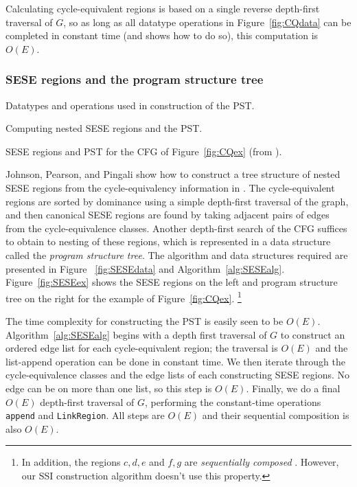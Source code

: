 \documentclass[12pt,titlepage,twoside]{article}
\newcommand{\figscale}{1.0}
\begin{document}
Calculating cycle-equivalent regions is based on a single reverse
depth-first traversal of $G$, so as long as all datatype operations in
Figure~\ref{fig:CQdata} can be completed in constant time (and
\cite{johnson93:sese} shows how to do so), this computation is $O(E)$.

\subsubsection{SESE regions and the program structure tree}
\begin{myfigure}\small
\caption{Datatypes and operations used in construction of the PST.}
\label{fig:SESEdata}\end{myfigure}
\begin{myalgorithm}\small
\caption{Computing nested SESE regions and the PST.}
\label{alg:SESEalg}\end{myalgorithm}
\begin{myfigure}\centering
\vertcenter{\renewcommand{\figscale}{0.5}}\hspace{1cm}
\vertcenter{\renewcommand{\figscale}{0.7}}
\caption{SESE regions and PST for the CFG of
         Figure~\ref{fig:CQex} (from \cite{johnson94:pst}).}
\label{fig:SESEex}\end{myfigure}

Johnson, Pearson, and Pingali show how to construct a tree structure
of nested SESE regions from the cycle-equivalency information in
\cite{johnson94:pst}.  The cycle-equivalent regions are sorted by
dominance using a simple depth-first traversal of the graph, and then
canonical SESE regions are found by taking adjacent pairs of
edges from the cycle-equivalence classes.  Another depth-first search
of the CFG suffices to obtain to nesting of these regions,
which is represented in a data structure called the 
\emph{program structure tree}.
The algorithm and data structures required are presented in Figure~%
\ref{fig:SESEdata} and Algorithm~\ref{alg:SESEalg}.  Figure~\vref{fig:SESEex}
shows the SESE regions on the left and program structure tree on
the right for the example of Figure~\vref{fig:CQex}.%
\footnote{In addition, the regions ${c,d,e}$ and ${f,g}$ are
\emph{sequentially composed} \cite{johnson94:pst}. 
However, our SSI construction algorithm doesn't use this property.}

The time complexity for constructing the PST is easily seen to be
$O(E)$. Algorithm~\vref{alg:SESEalg} begins
with a depth first traversal of $G$ to construct an ordered edge list
for each cycle-equivalent region; the traversal is $O(E)$ and the
list-append operation can be done in constant time.  We then iterate
through the cycle-equivalence classes and the edge lists of each
constructing SESE regions.  No edge can be on more than one list, so
this step is $O(E)$.  Finally, we do a final $O(E)$ depth-first
traversal of $G$, performing the constant-time operations {\tt append}
and {\tt LinkRegion}.  All steps are $O(E)$ and their sequential
composition is also $O(E)$.
\end{document}
